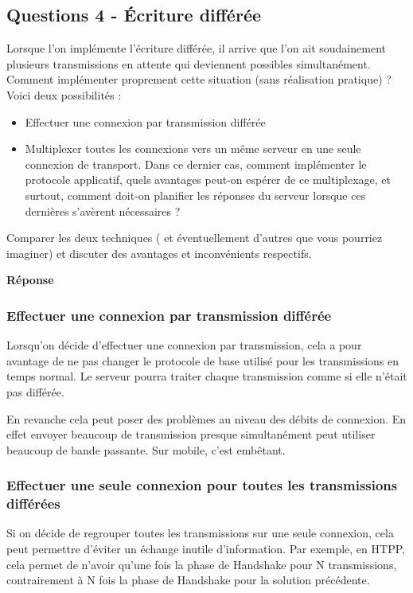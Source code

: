 \documentclass[francais,12pt]{article}
\begin{document}
	
	\subsection*{Questions 4 - Écriture différée}    
	Lorsque l'on implémente l'écriture différée, il arrive que l'on ait soudainement plusieurs transmissions en attente qui deviennent possibles simultanément. Comment implémenter proprement cette situation (sans réalisation pratique) ? Voici deux possibilités :
	\begin{itemize}
		\item Effectuer une connexion par transmission différée
		\item Multiplexer toutes les connexions vers un même serveur en une seule connexion de transport. Dans ce dernier cas, comment implémenter le protocole applicatif, quels avantages peut-on espérer de ce multiplexage, et surtout, comment doit-on planifier les réponses du serveur lorsque ces dernières s'avèrent nécessaires ?
	\end{itemize}
	
	Comparer les deux techniques ( et éventuellement d'autres que vous pourriez imaginer) et discuter des avantages et inconvénients respectifs.
	
	{\color[rgb]{0,0.5,0.23}\textbf{Réponse}}
	
	\subsubsection*{Effectuer une connexion par transmission différée}
	Lorsqu'on décide d'effectuer une connexion par transmission, cela a pour avantage de ne pas changer le protocole de base utilisé pour les transmissions en temps normal. Le serveur pourra traiter chaque transmission comme si elle n'était pas différée. 
	
	En revanche cela peut poser des problèmes au niveau des débits de connexion. En effet envoyer beaucoup de transmission presque simultanément peut utiliser beaucoup de bande passante. Sur mobile, c'est embêtant. 
	\subsubsection*{Effectuer une seule connexion pour toutes les transmissions différées}
	Si on décide de regrouper toutes les transmissions sur une seule connexion, cela peut permettre d'éviter un échange inutile d'information. Par exemple, en HTPP, cela permet de n'avoir qu'une fois la phase de Handshake pour N transmissions, contrairement à N fois la phase de Handshake pour la solution précédente. 
	
\end{document}
